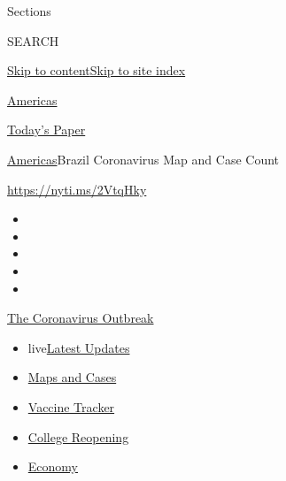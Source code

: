 Sections

SEARCH

\protect\hyperlink{site-content}{Skip to
content}\protect\hyperlink{site-index}{Skip to site index}

\href{https://www.nytimes3xbfgragh.onion/section/world/americas}{Americas}

\href{https://myaccount.nytimes3xbfgragh.onion/auth/login?response_type=cookie\&client_id=vi}{}

\href{https://www.nytimes3xbfgragh.onion/section/todayspaper}{Today's
Paper}

\href{/section/world/americas}{Americas}\textbar{}Brazil Coronavirus Map
and Case Count

\url{https://nyti.ms/2VtqHky}

\begin{itemize}
\item
\item
\item
\item
\item
\end{itemize}

\href{https://www.nytimes3xbfgragh.onion/news-event/coronavirus?action=click\&pgtype=Article\&state=default\&region=TOP_BANNER\&context=storylines_menu}{The
Coronavirus Outbreak}

\begin{itemize}
\tightlist
\item
  live\href{https://www.nytimes3xbfgragh.onion/2020/08/04/world/coronavirus-cases.html?action=click\&pgtype=Article\&state=default\&region=TOP_BANNER\&context=storylines_menu}{Latest
  Updates}
\item
  \href{https://www.nytimes3xbfgragh.onion/interactive/2020/us/coronavirus-us-cases.html?action=click\&pgtype=Article\&state=default\&region=TOP_BANNER\&context=storylines_menu}{Maps
  and Cases}
\item
  \href{https://www.nytimes3xbfgragh.onion/interactive/2020/science/coronavirus-vaccine-tracker.html?action=click\&pgtype=Article\&state=default\&region=TOP_BANNER\&context=storylines_menu}{Vaccine
  Tracker}
\item
  \href{https://www.nytimes3xbfgragh.onion/2020/08/02/us/covid-college-reopening.html?action=click\&pgtype=Article\&state=default\&region=TOP_BANNER\&context=storylines_menu}{College
  Reopening}
\item
  \href{https://www.nytimes3xbfgragh.onion/live/2020/08/04/business/stock-market-today-coronavirus?action=click\&pgtype=Article\&state=default\&region=TOP_BANNER\&context=storylines_menu}{Economy}
\end{itemize}

